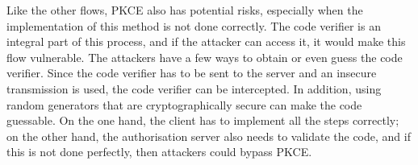 Like the other flows, PKCE also has potential risks, especially when the implementation of this method is not done correctly.
The code verifier is an integral part of this process, and if the attacker can access it, it would make this flow vulnerable.
The attackers have a few ways to obtain or even guess the code verifier.
Since the code verifier has to be sent to the server and an insecure transmission is used, the code verifier can be intercepted.
In addition, using random generators that are cryptographically secure can make the code guessable.
On the one hand, the client has to implement all the steps correctly; on the other hand, the authorisation server also needs to validate the code, and if this is not done perfectly, then attackers could bypass PKCE.


\begingroup
\centering
\setlength{\tabcolsep}{6.5pt} %
